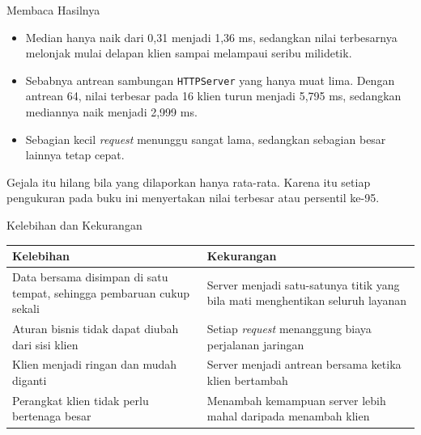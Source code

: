 \documentclass[aspectratio=169, table, 12pt]{beamer}
\begin{document}
\begin{frame}{{\Large Membaca Hasilnya}}
  \vspace{10pt}
  \begin{itemize}\small
    \item Median hanya naik dari 0,31 menjadi 1,36 ms, sedangkan nilai
          terbesarnya melonjak mulai delapan klien sampai melampaui seribu
          milidetik.
    \item Sebabnya antrean sambungan \texttt{HTTPServer} yang hanya muat lima.
          Dengan antrean 64, nilai terbesar pada 16 klien turun menjadi 5,795
          ms, sedangkan mediannya naik menjadi 2,999 ms.
    \item Sebagian kecil \textit{request} menunggu sangat lama, sedangkan
          sebagian besar lainnya tetap cepat.
  \end{itemize}

  \vspace{10pt}
  {\small Gejala itu hilang bila yang dilaporkan hanya rata-rata. Karena itu
  setiap pengukuran pada buku ini menyertakan nilai terbesar atau persentil
  ke-95.}
\end{frame}

\begin{frame}{{\Large Kelebihan dan Kekurangan}}
  \vspace{4pt}
  \centering
  \footnotesize
  \begin{tabularx}{\textwidth}{|X|X|}
    \hline
    \textbf{Kelebihan} & \textbf{Kekurangan} \\
    \hline
    Data bersama disimpan di satu tempat, sehingga pembaruan cukup sekali &
      Server menjadi satu-satunya titik yang bila mati menghentikan seluruh
      layanan \\
    \hline
    Aturan bisnis tidak dapat diubah dari sisi klien & Setiap \textit{request}
      menanggung biaya perjalanan jaringan \\
    \hline
    Klien menjadi ringan dan mudah diganti & Server menjadi antrean bersama
      ketika klien bertambah \\
    \hline
    Perangkat klien tidak perlu bertenaga besar & Menambah kemampuan server
      lebih mahal daripada menambah klien \\
    \hline
  \end{tabularx}
\end{frame}
\end{document}
